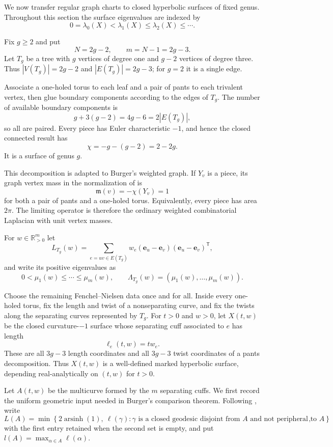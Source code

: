 \documentclass[11pt,reqno]{amsart}
\theoremstyle{definition}
\theoremstyle{remark}
\newcommand{\R}{\mathbb R}
\begin{document}
We now transfer regular graph charts to closed hyperbolic surfaces of fixed
genus.  Throughout this section the surface eigenvalues are indexed by
\[
 0=\lambda_0(X)<\lambda_1(X)\le\lambda_2(X)\le\cdots.
\]

Fix $g\ge2$ and put
\begin{equation}\label{eq:N-m-genus}
 N=2g-2,\qquad m=N-1=2g-3.
\end{equation}
Let $T_g$ be a tree with $g$ vertices of degree one and $g-2$ vertices of
degree three.  Thus $|V(T_g)|=2g-2$ and $|E(T_g)|=2g-3$; for $g=2$ it is a
single edge.

Associate a one-holed torus to each leaf and a pair of pants to each
trivalent vertex, then glue boundary components according to the edges of
$T_g$.  The number of available boundary components is
\[
 g+3(g-2)=4g-6=2|E(T_g)|,
\]
so all are paired.  Every piece has Euler characteristic $-1$, and hence the
closed connected result has
\[
 \chi=-g-(g-2)=2-2g.
\]
It is a surface of genus $g$.

This decomposition is adapted to Burger's weighted graph.  If $Y_v$ is a
piece, its graph vertex mass in the normalization of \cite{Burger1990} is
\[
 \mathfrak m(v)=-\chi(Y_v)=1
\]
for both a pair of pants and a one-holed torus.  Equivalently, every piece
has area $2\pi$.  The limiting operator is therefore the ordinary weighted
combinatorial Laplacian with unit vertex masses.

For $w\in\R_{>0}^{m}$ let
\[
 L_{T_g}(w)=\sum_{e=uv\in E(T_g)}
 w_e(\mathbf e_u-\mathbf e_v)(\mathbf e_u-\mathbf e_v)^{\mathsf T},
\]
and write its positive eigenvalues as
\[
 0<\mu_1(w)\le\cdots\le\mu_m(w),\qquad
 \Lambda_{T_g}(w)=(\mu_1(w),\ldots,\mu_m(w)).
\]

Choose the remaining Fenchel--Nielsen data once and for all.  Inside every
one-holed torus, fix the length and twist of a nonseparating curve, and fix
the twists along the separating curves represented by $T_g$.  For $t>0$
and $w>0$, let $X(t,w)$ be the closed curvature-$-1$ surface whose
separating cuff associated to $e$ has length
\begin{equation}\label{eq:cuff-length}
 \ell_e(t,w)=tw_e.
\end{equation}
These are all $3g-3$ length coordinates and all $3g-3$ twist coordinates of
a pants decomposition.  Thus $X(t,w)$ is a well-defined marked hyperbolic
surface, depending real-analytically on $(t,w)$ for $t>0$.

Let $A(t,w)$ be the multicurve formed by the $m$ separating cuffs.  We first
record the uniform geometric input needed in Burger's comparison theorem.
Following \cite{Burger1990}, write
\begin{equation}\label{eq:burger-L-definition}
 L(A)=\min\!\left\{2\operatorname{arsinh}(1),\ 
  \ell(\gamma):\gamma\text{ is a closed geodesic disjoint from }A
  \text{ and not peripheral to }A\right\},
\end{equation}
with the first entry retained when the second set is empty, and put
$l(A)=\max_{\alpha\in A}\ell(\alpha)$.
\end{document}
